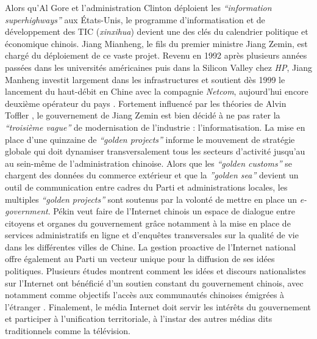 Alors qu’Al Gore et l’administration Clinton déploient les \textit{“information superhighways”} aux États-Unis, le programme d’informatisation et de développement des TIC (\textit{xinxihua}) devient une des clés du calendrier politique et économique chinois. Jiang Mianheng, le fils du premier ministre Jiang Zemin, est chargé du déploiement de ce vaste projet. Revenu en 1992 après plusieurs années passées dans les universités américaines puis dans la Silicon Valley chez \textit{HP}, Jiang Manheng investit largement dans les infrastructures et soutient dès 1999 le lancement du haut-débit en Chine avec la compagnie \textit{Netcom}, aujourd’hui encore deuxième opérateur du pays \citep{Dai2007}. Fortement influencé par les théories de Alvin Toffler \citep{Tsui2007}, le gouvernement de Jiang Zemin est bien décidé à ne pas rater la \textit{“troisième vague”} de modernisation de l’industrie : l’informatisation. La mise en place d’une quinzaine de \textit{“golden projects”} informe le mouvement de stratégie globale qui doit dynamiser transversalement tous les secteurs d’activité jusqu’au au sein-même de l’administration chinoise. Alors que les \textit{“golden customs”} se chargent des données du commerce extérieur et que la \textit{”golden sea”} devient un outil de communication entre cadres du Parti et administrations locales, les multiples \textit{“golden projects”} sont soutenus par la volonté de mettre en place un \textit{e-government}. Pékin veut faire de l’Internet chinois un espace de dialogue entre citoyens et organes du gouvernement grâce notamment à la mise en place de services administratifs en ligne et d’enquêtes transversales sur la qualité de vie dans les différentes villes de Chine. La gestion proactive de l’Internet national offre également au Parti un vecteur unique pour la diffusion de ses idées politiques. Plusieurs études montrent comment les idées et discours nationalistes sur l’Internet ont bénéficié d’un soutien constant du gouvernement chinois, avec notamment comme objectifs l’accès aux communautés chinoises émigrées à l’étranger \citep{Hughes2000}. Finalement, le média Internet doit servir les intérêts du gouvernement et participer à l’unification territoriale, à l’instar des autres médias dits traditionnels comme la télévision.

